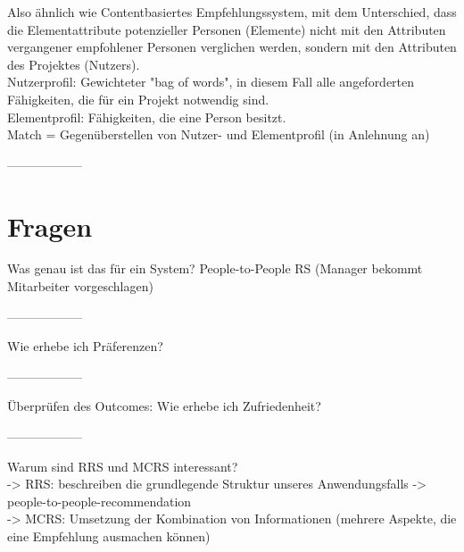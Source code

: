 Also ähnlich wie Contentbasiertes Empfehlungssystem, mit dem Unterschied, dass die Elementattribute potenzieller Personen (Elemente) nicht mit den Attributen vergangener empfohlener Personen verglichen werden, sondern mit den Attributen des Projektes (Nutzers).\\
Nutzerprofil: Gewichteter "bag of words", in diesem Fall alle angeforderten Fähigkeiten, die für ein Projekt notwendig sind.\\
Elementprofil: Fähigkeiten, die eine Person besitzt.\\
Match = Gegenüberstellen von  Nutzer- und Elementprofil (in Anlehnung an) %

------------------

\newpage

\section{Fragen}
\label{ch:notizen:fragen}

Was genau ist das für ein System? People-to-People RS (Manager bekommt Mitarbeiter vorgeschlagen)

------------------

Wie erhebe ich Präferenzen? %

------------------

Überprüfen des Outcomes:
Wie erhebe ich Zufriedenheit? %

------------------

Warum sind RRS und MCRS interessant?\\
-> RRS: beschreiben die grundlegende Struktur unseres Anwendungsfalls -> people-to-people-recommendation\\
-> MCRS: Umsetzung der Kombination von Informationen (mehrere Aspekte, die eine Empfehlung ausmachen können)

